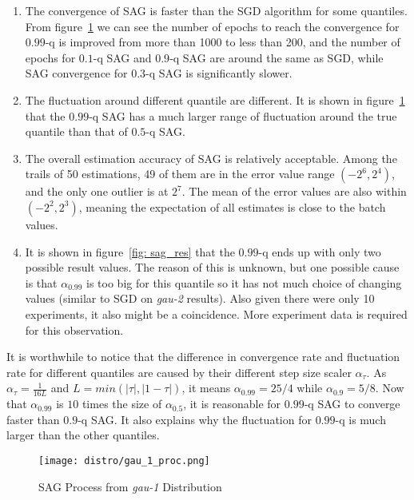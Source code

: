 \begin{enumerate}
    \item The convergence of SAG is faster than the SGD algorithm for some quantiles. From figure~\ref{fig: sag_proc} we can see the number of epochs to reach the convergence for $0.99$-q is improved from more than 1000 to less than 200, and the number of epochs for $0.1$-q SAG and $0.9$-q SAG are around the same as SGD, while SAG convergence for $0.3$-q SAG is significantly slower.
    \item The fluctuation around different quantile are different. It is shown in figure~\ref{fig: sag_proc} that the $0.99$-q SAG has a much larger range of fluctuation around the true quantile than that of $0.5$-q SAG.
    \item The overall estimation accuracy of SAG is relatively acceptable. Among the trails of 50 estimations, 49 of them are in the error value range $(-2^6, 2^4)$, and the only one outlier is at $2^7$. The mean of the error values are also within $(-2^2, 2^3)$, meaning the expectation of all estimates is close to the batch values.
    \item It is shown in figure~\ref{fig: sag_res} that the $0.99$-q ends up with only two possible result values. The reason of this is unknown, but one possible cause is that $\alpha_{0.99}$ is too big for this quantile so it has not much choice of changing values (similar to SGD on \textit{gau-2} results). Also given there were only 10 experiments, it also might be a coincidence. More experiment data is required for this observation.
\end{enumerate}

It is worthwhile to notice that the difference in convergence rate and fluctuation rate for different quantiles are caused by their different step size scaler $\alpha_\tau$. As $\alpha_\tau =\frac{1}{16L}$ and $L = min(|\tau|, |1-\tau|)$, it means $\alpha_{0.99} = 25/4$ while $\alpha_{0.9} = 5/8$. Now that $\alpha_{0.99}$ is $10$ times the size of $\alpha_{0.5}$, it is reasonable for $0.99$-q SAG to converge faster than $0.9$-q SAG. It also explains why the fluctuation for $0.99$-q is much larger than the other quantiles.

\graphicspath{{Figures/Stepsize_adapt/SAG/}{./}} 

\begin{figure}[H]
    \centering
	\texttt{[image: distro/gau\_1\_proc.png]}
    \caption{SAG Process from \textit{gau-1} Distribution}
    \label{fig: sag_proc}
\end{figure}

